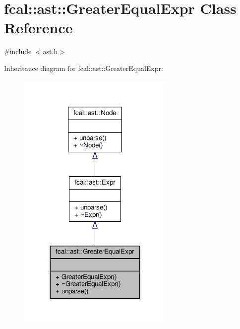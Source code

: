 \hypertarget{classfcal_1_1ast_1_1GreaterEqualExpr}{}\section{fcal\+:\+:ast\+:\+:Greater\+Equal\+Expr Class Reference}
\label{classfcal_1_1ast_1_1GreaterEqualExpr}


{\ttfamily \#include $<$ast.\+h$>$}



Inheritance diagram for fcal\+:\+:ast\+:\+:Greater\+Equal\+Expr\+:
\nopagebreak
\begin{figure}[H]
\begin{center}
\leavevmode
\includegraphics[width=215pt]{classfcal_1_1ast_1_1GreaterEqualExpr__inherit__graph}
\end{center}
\end{figure}


